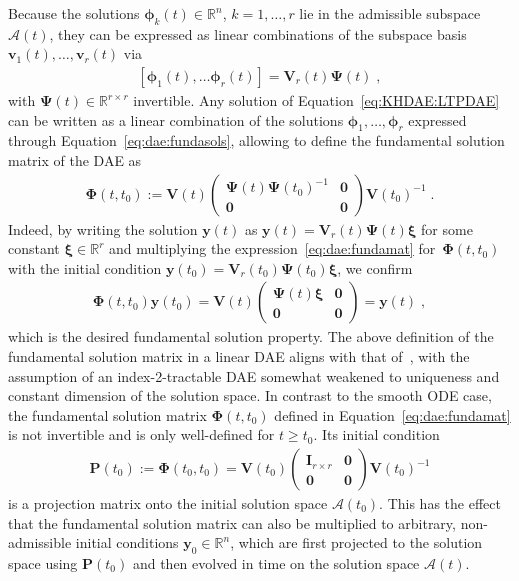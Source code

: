 \documentclass[a4paper, nonatbib, 3p, twocolumn]{elsarticle}
\theoremstyle{plain}
\theoremstyle{definition}
\theoremstyle{remark}
\newcommand{\vzero}{\mathbf{0}}
\newcommand{\Rspace}{\mathbb{R}}
\newcommand{\vxi}{\bm{\xi}}
\newcommand{\vvph}{\bm{\phi}}
\newcommand{\vPh}{\mathbf \Phi}
\newcommand{\vPs}{\mathbf \Psi}
\newcommand{\vv}{\mathbf v}
\newcommand{\vy}{\mathbf y}
\newcommand{\vI}{\mathbf I}
\newcommand{\vP}{\mathbf P}
\newcommand{\vV}{\mathbf V}
\newcommand{\cA}{\mathcal{A}}
\begin{document}
Because the solutions $\vvph_k(t)\in\Rspace^n$, $k = 1, \dots, r$ lie in the admissible subspace $\cA(t)$, they can be expressed as linear combinations of the subspace basis $\vv_1(t), \dots, \vv_r(t)$ via
\begin{align}\label{eq:dae:fundasols}
\left[ \vvph_1(t), \dots \vvph_r(t)\right] = \vV_r(t) \vPs(t)  \;,
\end{align}
with $\vPs(t) \in \Rspace^{r \times r}$ invertible. Any solution of Equation~\eqref{eq:KHDAE:LTPDAE} can be written as a linear combination of the solutions $\vvph_1, \dots, \vvph_r$ expressed through Equation~\eqref{eq:dae:fundasols}, allowing to define the fundamental solution matrix of the DAE as 
\begin{align}\label{eq:dae:fundamat}
    \vPh(t, t_0) := \vV(t) \begin{pmatrix}
        \vPs(t) \vPs(t_0)^{-1} & \vzero \\ \vzero & \vzero
    \end{pmatrix} \vV(t_0)^{-1} \;.
\end{align}
Indeed, by writing the solution $\vy(t)$ as $\vy(t) = \vV_r(t) \vPs(t) \vxi$ for some constant $\vxi \in \Rspace^r$ and multiplying the expression~\eqref{eq:dae:fundamat} for~$\vPh(t, t_0)$ with the initial condition $\vy(t_0) = \vV_r(t_0) \vPs(t_0) \vxi$, we confirm 
\begin{align}
    \vPh(t, t_0) \vy(t_0) = \vV(t) \begin{pmatrix}
        \vPs(t) \vxi & \vzero \\ \vzero & \vzero
    \end{pmatrix} = \vy(t) \;,
\end{align}
which is the desired fundamental solution property. The above definition of the fundamental solution matrix in a linear DAE aligns with that of~\cite[Theorem~3.1]{Lamour2003}, with the assumption of an index-2-tractable DAE somewhat weakened to uniqueness and constant dimension of the solution space. In contrast to the smooth ODE case, the fundamental solution matrix $\vPh(t, t_0)$ defined in Equation~\eqref{eq:dae:fundamat} is not invertible and is only well-defined for $t \geq t_0$. Its initial condition
\begin{align}
    \vP(t_0) := \vPh(t_0, t_0) = \vV(t_0) \begin{pmatrix}
        \vI_{r\times r} & \vzero \\ \vzero & \vzero
    \end{pmatrix} \vV(t_0)^{-1}
\end{align}
is a projection matrix onto the initial solution space $\cA(t_0)$. This has the effect that the fundamental solution matrix can also be multiplied to arbitrary, non-admissible initial conditions $\vy_0 \in \Rspace^n$, which are first projected to the solution space using $\vP(t_0)$ and then evolved in time on the solution space $\cA(t)$.
\end{document}
